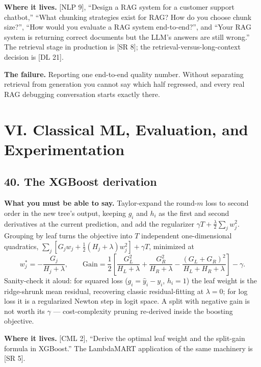 \textbf{Where it lives.} [NLP 9], ``Design a RAG system for a customer support chatbot,'' ``What chunking strategies exist for RAG? How do you choose chunk size?'', ``How would you evaluate a RAG system end-to-end?'', and ``Your RAG system is returning correct documents but the LLM's answers are still wrong.'' The retrieval stage in production is [SR 8]; the retrieval-versus-long-context decision is [DL 21].

\textbf{The failure.} Reporting one end-to-end quality number. Without separating retrieval from generation you cannot say which half regressed, and every real RAG debugging conversation starts exactly there.

\section*{VI. Classical ML, Evaluation, and Experimentation}

\subsection*{40. The XGBoost derivation}

\textbf{What you must be able to say.} Taylor-expand the round-$m$ loss to second order in the new tree's output, keeping $g_i$ and $h_i$ as the first and second derivatives at the current prediction, and add the regularizer $\gamma T + \frac{\lambda}{2}\sum_j w_j^2$. Grouping by leaf turns the objective into $T$ independent one-dimensional quadratics, $\sum_j [G_j w_j + \frac{1}{2}(H_j + \lambda)w_j^2] + \gamma T$, minimized at
\[
w_j^{*} = -\frac{G_j}{H_j + \lambda},
\qquad
\mathrm{Gain} = \frac{1}{2}\left[\frac{G_L^2}{H_L + \lambda} + \frac{G_R^2}{H_R + \lambda} - \frac{(G_L + G_R)^2}{H_L + H_R + \lambda}\right] - \gamma .
\]
Sanity-check it aloud: for squared loss ($g_i = \hat{y}_i - y_i$, $h_i = 1$) the leaf weight is the ridge-shrunk mean residual, recovering classic residual-fitting at $\lambda = 0$; for log loss it is a regularized Newton step in logit space. A split with negative gain is not worth its $\gamma$ --- cost-complexity pruning re-derived inside the boosting objective.

\textbf{Where it lives.} [CML 2], ``Derive the optimal leaf weight and the split-gain formula in XGBoost.'' The LambdaMART application of the same machinery is [SR 5].

